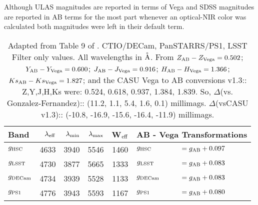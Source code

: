 \documentclass[usenatbib]{mnras}
\begin{document}
    Although ULAS magnitudes are reported in terms of Vega and SDSS
    magnitudes are reported in AB terms for the most part whenever an
    optical-NIR color was calculated both magnitudes were left in their
    default term.
    
\begin{table*}
  \begin{center}
   \caption{Adapted from Table 9 of \citet{Peth2011}. 
CTIO/DECam, PanSTARRS/PS1, LSST
Filter only values. 
All wavelengths in ${\buildrel _{\circ} \over {\mathrm{A}}}$. 
From \citet{GonzalezFernandez2018} 
$Z_{\rm AB}   -  Z_{\rm Vega}  = 0.502$;  
$Y_{\rm AB}  -  Y_{\rm Vega}    = 0.600 $;
$J_{\rm AB}   -  J_{\rm Vega}    = 0.916  $;
$H_{\rm AB}  -  H_{\rm Vega}    = 1.366 $;
$Ks_{\rm AB}  -  Ks_{\rm Vega}  = 1.827 $;
and the CASU Vega to AB conversions v1.3:: 
	Z,Y,J,H,Ks were: 0.524, 0.618, 0.937, 1.384, 1.839. 
So, $\Delta$(vs. Gonzalez-Fernandez)::
	(11.2,     1.1,    5.4,     1.6,    0.1) millimags. 
$\Delta$(vsCASU v1.3)::
	(-10.8, -16.9, -15.6,  -16.4, -11.9) millimags. 
}
    \setlength{\tabcolsep}{4pt}
     \begin{tabular}{l r r r  c l l}
      \hline
      \hline
      Band & $\lambda_{\rm eff}  $ 
              &  $\lambda_{\rm min} $ 
              & $\lambda_{\rm max} $ 
              & W$_{\rm eff}$
              & \multicolumn{2}{c}{AB - Vega  Transformations} \\
      \hline
       $g_{\rm HSC}$    &  	4633   &     3940     &   5546	&  1460       &    $g_{\rm HSC}$         &$  = g_{\rm AB} + 0.097 $ \\
      $g_{\rm LSST}$      &     4730     &	  3877    &	   5665   &  1333   &  $g_{\rm LSST}$       &$ = g_{\rm AB} +  0.083 $ \\   %
      $g_{\rm DECam}$  &      4734     &   3939    &    5528   &   1133        &  $g_{\rm DECam} $    &$  = g_{\rm AB} + 0.083 $ \\	     
       $g_{\rm PS1}$        &    4776    &    3943    &    5593   &   1167        &  $g_{\rm PS1}$         &$  = g_{\rm AB} + 0.080 $ \\   %

\end{tabular}
\end{center}
\end{table*}
\end{document}
